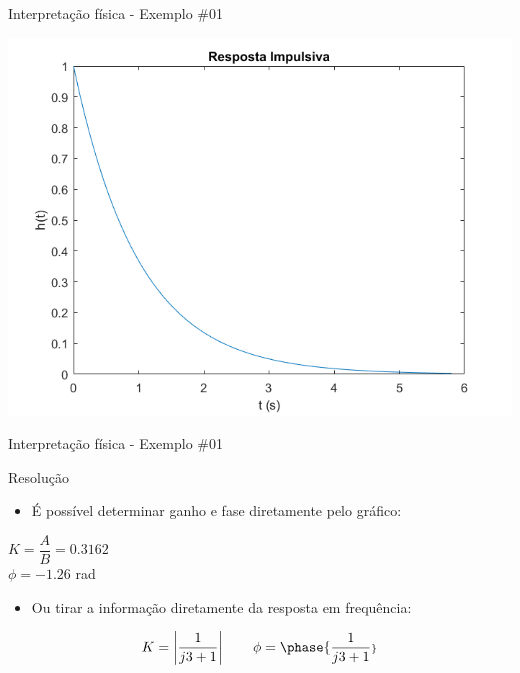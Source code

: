 \begin{frame}{Interpretação física - Exemplo \#01}
\centerline{\includegraphics[width=0.8\linewidth]{Figuras/Ch13/fig1.png}}
\end{frame}

\begin{frame}{Interpretação física - Exemplo \#01}
    \begin{block}{Resolução}
    \begin{itemize}
        \item É possível determinar ganho e fase diretamente pelo gráfico:
    \end{itemize}
        \begin{center}
            $ K = \dfrac{A}{B} = \num{0,3162} $\\
            \vspace{0.2cm}
            $ \phi = -\num{1,26}$ rad\\
        \end{center}
    \vspace{0.3 cm}
    \begin{itemize}
        \item Ou tirar a informação diretamente da resposta em frequência:
    \end{itemize}
        \begin{equation*}
            K = \left| \dfrac{1}{j3 + 1}\right|
            \qquad \phi = \phase{\scriptstyle \dfrac{1}{j3 + 1}}
        \end{equation*}
\end{block}
\end{frame}

